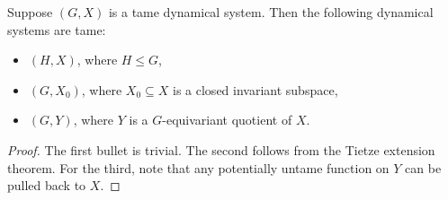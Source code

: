 	
	\begin{fct}
		\label{fct:tame_preserved}
		Suppose $(G,X)$ is a tame dynamical system. Then the following dynamical systems are tame:
		\begin{itemize}
			\item
			$(H,X)$, where $H\leq G$,
			\item
			$(G,X_0)$, where $X_0\subseteq X$ is a closed invariant subspace,
			\item
			$(G,Y)$, where $Y$ is a $G$-equivariant quotient of $X$.
		\end{itemize}
	\end{fct}
	\begin{proof}
		The first bullet is trivial. The second follows from the Tietze extension theorem. For the third, note that any potentially untame function on $Y$ can be pulled back to $X$.
	\end{proof}
	
	
	
